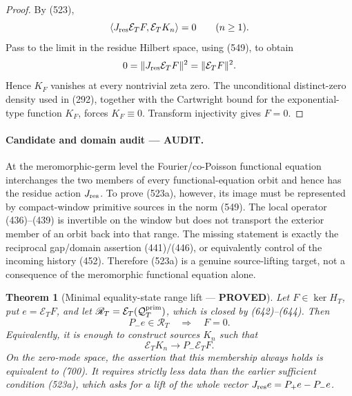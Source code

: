 \documentclass[11pt]{article}
\newtheorem{theorem}{Theorem}
\newcommand{\PROVED}{\textcolor{green!45!black}{\textbf{PROVED}}}
\newcommand{\AUDIT}{\textcolor{orange!75!black}{\textbf{AUDIT}}}
\begin{document}
\begin{proof}
By (523),
\[
 \langle J_{\rm res}\mathcal E_TF,\mathcal E_TK_n\rangle=0
 \qquad(n\ge1).
\]
Pass to the limit in the residue Hilbert space, using (549), to obtain
\[
 0=\|J_{\rm res}\mathcal E_TF\|^2
  =\|\mathcal E_TF\|^2.
\]
Hence \(K_F\) vanishes at every nontrivial zeta zero.  The unconditional
distinct-zero density used in (292), together with the Cartwright bound for
the exponential-type function \(K_F\), forces \(K_F\equiv0\).  Transform
injectivity gives \(F=0\).
\end{proof}

\paragraph{Candidate and domain audit --- \AUDIT.}
At the meromorphic-germ level the Fourier/co-Poisson functional equation
interchanges the two members of every functional-equation orbit and hence
has the residue action \(J_{\rm res}\).  To prove (523a), however, its image
must be represented by compact-window primitive sources in the norm (549).
The local operator (436)--(439) is invertible on the window but does not
transport the exterior member of an orbit back into that range.  The
missing statement is exactly the reciprocal gap/domain assertion
(441)/(446), or equivalently control of the incoming history (452).
Therefore (523a) is a genuine source-lifting target, not a consequence of
the meromorphic functional equation alone.

\begin{theorem}[Minimal equality-state range lift --- \PROVED]
Let \(F\in\ker H_T\), put \(e=\mathcal E_TF\), and let
\(\mathscr R_T=\mathcal E_T(\mathcal Q_T^{\rm prim})\), which is closed by
(642)--(644).  Then
\begin{equation}
 \boxed{P_-e\in\mathscr R_T\quad\Longrightarrow\quad F=0.}     \tag{702}
\end{equation}
Equivalently, it is enough to construct sources \(K_n\) such that
\[
 \mathcal E_TK_n\longrightarrow P_-\mathcal E_TF .
\]
On the zero-mode space, the assertion that this membership always holds is
equivalent to (700).  It requires strictly less data than the earlier
sufficient condition (523a), which asks for a lift of the whole vector
\(J_{\rm res}e=P_+e-P_-e\).
\end{theorem}
\end{document}
